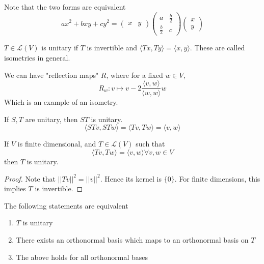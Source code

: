 \documentclass[12pt]{article}
\begin{document}
\begin{ex}
	Note that the two forms are equivalent
	$$ax^2 + bxy + cy^2 = \begin{pmatrix} x & y \end{pmatrix} \begin{pmatrix} a & \frac{b}{2} \\ \frac{b}{2} & c \end{pmatrix} \begin{pmatrix} x \\ y \end{pmatrix} $$
\end{ex}

\begin{defn}
	$T \in \mathcal L(V)$ is unitary if $T$ is invertible and $\langle Tx,Ty \rangle = \langle x,y \rangle$. These are called isometries in general.
\end{defn}

\begin{ex}
	We can have "reflection maps" $R$, where for a fixed $w \in V$,
	$$R_w: v \mapsto v - 2\frac{\langle v,w \rangle}{\langle w,w \rangle}w$$
	Which is an example of an isometry.
\end{ex}

\begin{lem}
	If $S,T$ are unitary, then $ST$ is unitary.
	$$\langle STv,STw \rangle = \langle Tv,Tw \rangle = \langle v,w \rangle$$
\end{lem}

\begin{lem}
	If $V$ is finite dimensional, and $T \in \mathcal L(V)$ such that
	$$\langle Tv,Tw \rangle = \langle v,w \rangle \forall v,w \in V$$
	then $T$ is unitary.
\end{lem}

\begin{proof}
	Note that $||Tv||^2 = ||v||^2$. Hence its kernel is $\{0\}$. For finite dimensions, this implies $T$ is invertible.
\end{proof}

\begin{thm}
	The following statements are equivalent
	\begin{enumerate}
		\item $T$ is unitary
		\item There exists an orthonormal basis which maps to an orthonormal basis on $T$
		\item The above holds for all orthonormal bases
	\end{enumerate}
\end{thm}
\end{document}
